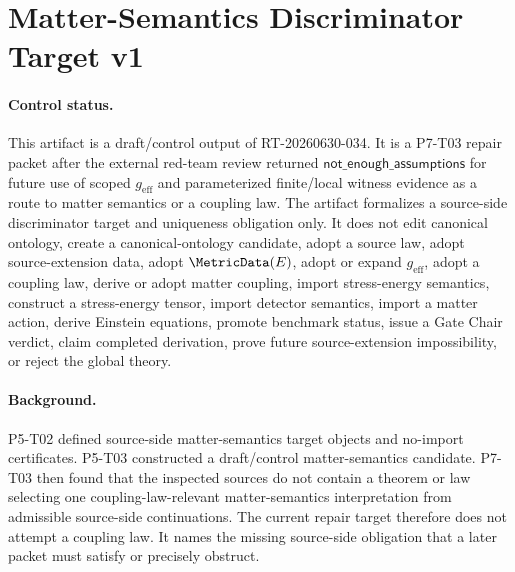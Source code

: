 \section*{Matter-Semantics Discriminator Target v1}

\paragraph{Control status.}
This artifact is a draft/control output of RT-20260630-034.  It is a
P7-T03 repair packet after the external red-team review returned
\(\mathsf{not\_enough\_assumptions}\) for future use of scoped
\(g_{\mathrm{eff}}\) and parameterized finite/local witness evidence as a
route to matter semantics or a coupling law.  The artifact formalizes a
source-side discriminator target and uniqueness obligation only.  It does not
edit canonical ontology, create a canonical-ontology candidate, adopt a
source law, adopt source-extension data, adopt \(\MetricData(E)\), adopt or
expand \(g_{\mathrm{eff}}\), adopt a coupling law, derive or adopt matter
coupling, import stress-energy semantics, construct a stress-energy tensor,
import detector semantics, import a matter action, derive Einstein equations,
promote benchmark status, issue a Gate Chair verdict, claim completed
derivation, prove future source-extension impossibility, or reject the global
theory.

\paragraph{Background.}
P5-T02 defined source-side matter-semantics target objects and no-import
certificates.  P5-T03 constructed a draft/control matter-semantics candidate.
P7-T03 then found that the inspected sources do not contain a theorem or law
selecting one coupling-law-relevant matter-semantics interpretation from
admissible source-side continuations.  The current repair target therefore
does not attempt a coupling law.  It names the missing source-side obligation
that a later packet must satisfy or precisely obstruct.

\newcommand{\Bcur}{B_{\mathrm{cur}}}
\newcommand{\MSCand}{\mathrm{MatterSemanticsCandidate}^{\mathrm{cand}}_{v1}}
\newcommand{\MSAdm}{\mathrm{MSAdm}_{v1}}
\newcommand{\MSEq}{\equiv_{\mathrm{MS},E}}
\newcommand{\MSDisc}{\mathrm{MSDiscTarget}_{v1}}
\newcommand{\MSUniq}{\mathrm{MSUniqObl}_{v1}}
\newcommand{\MSFail}{\mathrm{MatterSemanticsFailureObstruction}_{v1}}
\newcommand{\NoTarget}{\mathrm{NoTargetImport}_{v1}}
\newcommand{\NoDetector}{\mathrm{NoDetectorImport}_{v1}}
\newcommand{\NoSE}{\mathrm{NoStressEnergyImport}_{v1}}
\newcommand{\NoAction}{\mathrm{NoMatterActionImport}_{v1}}


